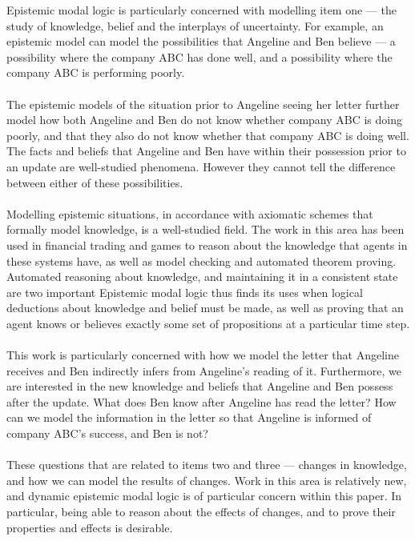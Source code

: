 Epistemic modal logic is particularly concerned with modelling item one --- the study of knowledge,
belief and the interplays of uncertainty.
For example, an epistemic model can model the possibilities that Angeline and Ben believe --- a
possibility where the company ABC has done well, and a possibility where the company ABC is
performing poorly.\\
\\
The epistemic models of the situation prior to Angeline seeing her letter further model how both Angeline
and Ben do not know whether company ABC is doing poorly, and that they also do not know whether
that company ABC is doing well.
The facts and beliefs that Angeline and Ben have within their possession prior to an update are well-studied phenomena.
However they cannot tell the difference between either of these possibilities.\\
\\
Modelling epistemic situations, in accordance with axiomatic schemes that
formally model knowledge, is a well-studied field.
The work in this area has been used in financial trading and games to reason about the knowledge
that agents in these systems have, as well as model checking and automated theorem proving.
Automated reasoning about knowledge, and maintaining it in a consistent state are two important 
Epistemic modal logic thus finds its uses when logical deductions about knowledge and belief must be
made, as well as proving that an agent knows or believes exactly some set of propositions at a
particular time step.\\
\\
This work is particularly concerned with how we model the letter that Angeline receives and Ben
indirectly infers from Angeline's reading of it.
Furthermore, we are interested in the new knowledge and beliefs that Angeline and Ben possess after the update.
What does Ben know after Angeline has read the letter?
How can we model the information in the letter so that Angeline is informed of company ABC's success,
and Ben is not?\\
\\
These questions that are related to items two and three --- changes in knowledge, and how we can
model the results of changes.
Work in this area is relatively new, and dynamic epistemic modal logic is of particular concern
within this paper.
In particular, being able to reason about the effects of changes, and to prove their properties and
effects is desirable.\\
\\
